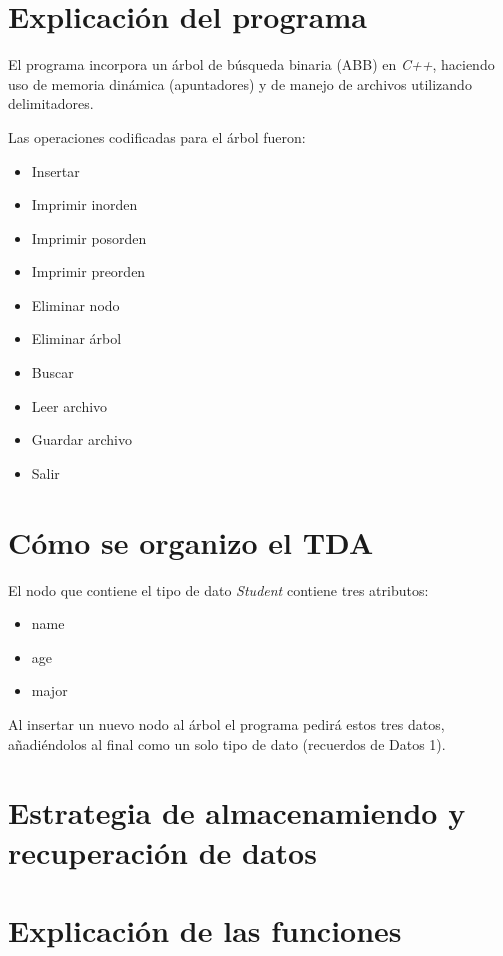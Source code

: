 \documentclass[11pt]{article}
\author{Diego Domínguez}
\date{\today}
\title{}
\begin{document}
\tableofcontents \clearpage
\section{Explicación del programa}
\label{sec:orgdef71fa}
El programa incorpora un árbol de búsqueda binaria
(ABB) en \emph{C++}, haciendo uso de memoria dinámica
(apuntadores) y de manejo de archivos utilizando delimitadores.

Las operaciones codificadas para el árbol fueron:
\begin{itemize}
\item Insertar
\item Imprimir inorden
\item Imprimir posorden
\item Imprimir preorden
\item Eliminar nodo
\item Eliminar árbol
\item Buscar
\item Leer archivo
\item Guardar archivo
\item Salir
\end{itemize}

\section{Cómo se organizo el TDA}
\label{sec:orgffe1549}
El nodo que contiene el tipo de dato \emph{Student}
contiene tres atributos:
\begin{itemize}
\item name
\item age
\item major
\end{itemize}
Al insertar un nuevo nodo al árbol el programa
pedirá estos tres datos, añadiéndolos al final
como un solo tipo de dato (recuerdos de Datos 1).

\section{Estrategia de almacenamiendo y recuperación de datos}
\label{sec:orgf5ab984}
\section{Explicación de las funciones}
\label{sec:org0369fbe}
\end{document}
